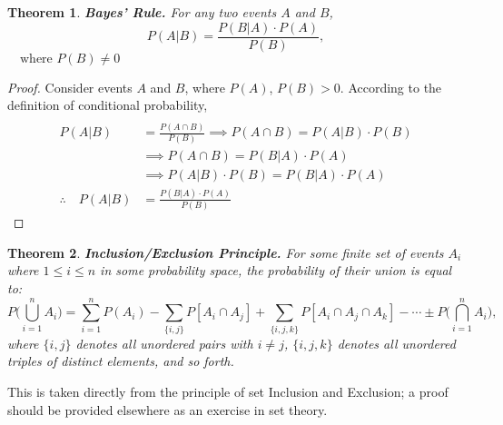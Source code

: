 \documentclass[a4paper]{article}
\newtheorem{thm}{Theorem}
\theoremstyle{definition}
\begin{document}
\begin{thm} \textbf{Bayes' Rule.} For any two events $A$ and $B$,
\begin{equation}
P(A|B) = \frac{P(B|A)\cdot P(A)}{P(B)}, 
\end{equation}
$\quad \text{where } P(B) \neq 0$
\end{thm}
\begin{proof} Consider events $A$ and $B$, where $P(A)$, $P(B) > 0$. According to the definition of conditional probability, 
\begin{align*} 
\\P(A|B) &= \frac{P(A \cap B)}{P(B)} \implies P(A\cap B) = P(A|B)\cdot P(B)
\\{}&\implies P(A\cap B) = P(B|A) \cdot P(A)
\\{}&\implies P(A|B)\cdot P(B) = P(B|A) \cdot P(A)
\\ \therefore \quad P(A|B) &= \frac{P(B|A)\cdot P(A)}{P(B)} 
\end{align*}
\end{proof}
\begin{thm} \textbf{Inclusion/Exclusion Principle.} For some finite set of events $A_i$ where $1 \leq i \leq n$ in some probability space, the probability of their union is equal to: 
$$P\bigg(\bigcup_{i=1}^n A_i \bigg) = \sum_{i=1}^n P(A_i) - \sum_{\{i,j\}} P[A_i \cap A_j] + \sum_{\{i,j,k\}} P[A_i \cap A_j \cap A_k] - \cdots \pm P\bigg(\bigcap_{i=1}^n A_i \bigg),$$
where $\{i, j\}$ denotes all unordered pairs with $i \neq j$, $\{i, j, k\}$ denotes all unordered triples of distinct elements, and so forth.
\end{thm}
This is taken directly from the principle of set Inclusion and Exclusion; a proof should be provided elsewhere as an exercise in set theory.
\end{document}

